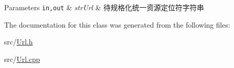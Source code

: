 \begin{DoxyParams}[1]{Parameters}
\mbox{\tt in,out}  & {\em str\+Url} & 待规格化统一资源定位符字符串 \\
\hline
\end{DoxyParams}


The documentation for this class was generated from the following files\+:\begin{DoxyCompactItemize}
\item 
src/\hyperlink{_url_8h}{Url.\+h}\item 
src/\hyperlink{_url_8cpp}{Url.\+cpp}\end{DoxyCompactItemize}

